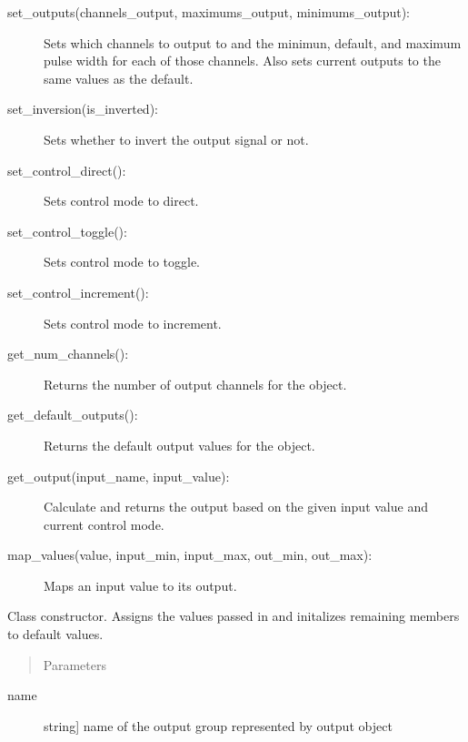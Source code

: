\documentclass[letterpaper,10pt,english]{sphinxmanual}
\begin{document}
\begin{fulllineitems}
\begin{description}
\item[{set\_outputs(channels\_output, maximums\_output, minimums\_output):}] \leavevmode
\sphinxAtStartPar
Sets which channels to output to and the minimun, default, and maximum pulse width for each of those channels.
Also sets current outputs to the same values as the default.

\item[{set\_inversion(is\_inverted):}] \leavevmode
\sphinxAtStartPar
Sets whether to invert the output signal or not.

\item[{set\_control\_direct():}] \leavevmode
\sphinxAtStartPar
Sets control mode to direct.

\item[{set\_control\_toggle():}] \leavevmode
\sphinxAtStartPar
Sets control mode to toggle.

\item[{set\_control\_increment():}] \leavevmode
\sphinxAtStartPar
Sets control mode to increment.

\item[{get\_num\_channels():}] \leavevmode
\sphinxAtStartPar
Returns the number of output channels for the object.

\item[{get\_default\_outputs():}] \leavevmode
\sphinxAtStartPar
Returns the default output values for the object.

\item[{get\_output(input\_name, input\_value):}] \leavevmode
\sphinxAtStartPar
Calculate and returns the output based on the given input value and current control mode.

\item[{map\_values(value, input\_min, input\_max, out\_min, out\_max):}] \leavevmode
\sphinxAtStartPar
Maps an input value to its output.

\end{description}

\begin{fulllineitems}
\label{\detokenize{specific:NeckTiltOutput.NeckTiltOutput.__init__}}
\sphinxAtStartPar
Class constructor. Assigns the values passed in and initalizes remaining members to default values.
\begin{quote}\begin{description}
\item[{Parameters}] \leavevmode
\end{description}\end{quote}
\begin{description}
\item[{name}] \leavevmode{[}string{]}
\sphinxAtStartPar
name of the output group represented by output object


\end{description}
\end{fulllineitems}
\end{fulllineitems}
\end{document}
